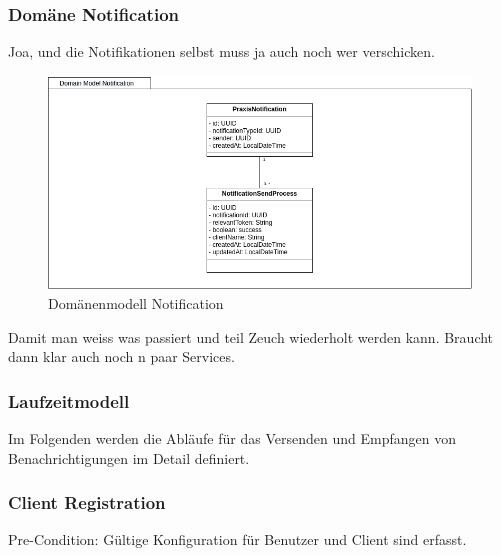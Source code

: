 \clearpage
\subsubsection*{Domäne Notification}

Joa, und die Notifikationen selbst muss ja auch noch wer verschicken.

\begin{figure}[h]
    \centering
    \begin{minipage}[b]{1.0\textwidth}
        \includegraphics[width=\textwidth]{graphics/Class_Notification_Domain}
        \caption{Domänenmodell Notification}
    \end{minipage}
\end{figure}

Damit man weiss was passiert und teil Zeuch wiederholt werden kann.
Braucht dann klar auch noch n paar Services.




\clearpage

\clearpage
\subsubsection{Laufzeitmodell}

Im Folgenden werden die Abläufe für das Versenden und Empfangen von Benachrichtigungen im Detail definiert.

\subsubsection*{Client Registration}

Pre-Condition: Gültige Konfiguration für Benutzer und Client sind erfasst.

